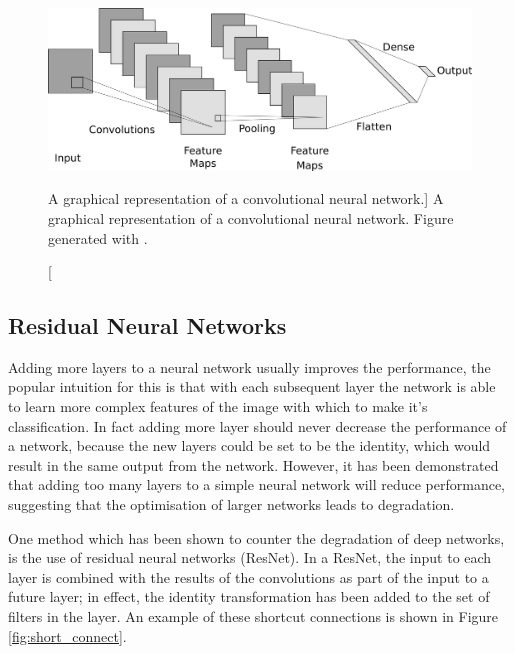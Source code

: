 \begin{figure}

	\centering

	\includegraphics[width = \textwidth]{figures/cnn_layer.png}

	\caption
	[A graphical representation of a convolutional neural network.]
	{ A graphical representation of a convolutional neural network. Figure
	generated with \cite{cnn_diagrams}.}

	\label{fig:cnn_layer}

\end{figure}

\subsection{Residual Neural Networks}
Adding more layers to a neural network usually improves the performance, the
popular intuition for this is that with each subsequent layer the network is
able to learn more complex features of the image with which to make it's
classification. In fact adding more layer should never decrease the 
performance of a network, because the new layers could be set to be the 
identity, which would result in the same output from the network. However, it 
has been demonstrated that adding too many layers to a simple neural network 
will reduce performance, suggesting that the optimisation of
larger networks leads to degradation\cite{He_2016_CVPR}.

One method which has been shown to counter the degradation of deep networks, 
is the use of residual neural networks (ResNet). In a ResNet, the input to 
each layer is combined with the results of the convolutions as part of the 
input to a future layer; in effect, the identity transformation has been added
to the set of filters in the layer. An example of these shortcut connections 
is shown in Figure \ref{fig:short_connect}\cite{He_2016_CVPR}. 

